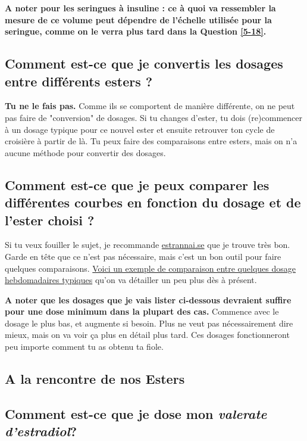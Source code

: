 \documentclass{article}
\begin{document}
\textbf{A noter pour les seringues à insuline : ce à quoi va ressembler la mesure de ce volume peut dépendre de l'échelle utilisée pour la seringue, comme on le verra plus tard dans la Question \ref{5-18}.}

\subsection{Comment est-ce que je convertis les dosages entre différents esters ?}

\textbf{Tu ne le fais pas.} Comme ils se comportent de manière différente, on ne peut pas faire de "conversion" de dosages. Si tu changes d'ester, tu dois (re)commencer à un dosage typique pour ce nouvel ester et ensuite retrouver ton cycle de croisière à partir de là. Tu peux faire des comparaisons entre esters, mais on n'a aucune méthode pour convertir des dosages.

\subsection{Comment est-ce que je peux comparer les différentes courbes en fonction du dosage et de l'ester choisi ?}

Si tu veux fouiller le sujet, je recommande \href{https://estrannai.se}{estrannai.se} que je trouve très bon. Garde en tête que ce n'est pas nécessaire, mais c'est un bon outil pour faire quelques comparaisons. \href{https://estrannai.se/\#i0__cu,7,7,1-cu,5,7,3-cu,5,7,2}{Voici un exemple de comparaison entre quelques dosage hebdomadaires typiques} qu'on va détailler un peu plus dès à présent.

\textbf{A noter que les dosages que je vais lister ci-dessous devraient suffire pour une dose minimum dans la plupart des cas.} Commence avec le dosage le plus bas, et augmente si besoin. Plus ne veut pas nécessairement dire mieux, mais on va voir ça plus en détail plus tard. Ces dosages fonctionneront peu importe comment tu as obtenu ta fiole.

\subsection*{A la rencontre de nos Esters}

\subsection{Comment est-ce que je dose mon \textit{valerate d'estradiol}?}
\end{document}
